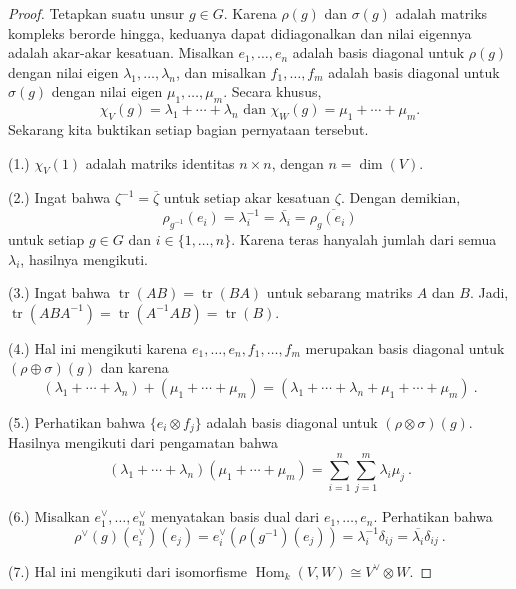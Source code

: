 \documentclass[12pt]{article}
\theoremstyle{plain}
\theoremstyle{definition}
\theoremstyle{remark}
\numberwithin{equation}{section}
\begin{document}
\begin{proof}
Tetapkan suatu unsur $g \in G$.
Karena $\rho(g)$ dan $\sigma(g)$ adalah matriks kompleks berorde hingga,
keduanya dapat didiagonalkan dan nilai eigennya adalah akar-akar kesatuan.
Misalkan $e_1,\ldots,e_n$ adalah basis diagonal untuk $\rho(g)$
dengan nilai eigen $\lambda_1, \ldots, \lambda_n$, dan
misalkan $f_1, \ldots, f_m$ adalah basis diagonal untuk $\sigma(g)$
dengan nilai eigen $\mu_1, \ldots, \mu_m$.
Secara khusus,
\[
\chi_V(g) = \lambda_1 + \cdots + \lambda_n \textrm{ dan }
\chi_W(g) = \mu_1 + \cdots + \mu_m.
\]
Sekarang kita buktikan setiap bagian pernyataan tersebut.

(1.)
$\chi_V(1)$ adalah matriks identitas $n \times n$, dengan $n=\dim(V)$.


(2.)
Ingat bahwa $\zeta^{-1}=\overline{\zeta}$ untuk setiap akar kesatuan
$\zeta$.
Dengan demikian,
\[
\rho_{g^{-1}}(e_i)=\lambda_i^{-1}=\overline{\lambda_i}=\overline{\rho_g(e_i)}
\]
untuk setiap $g \in G$ dan $i \in \{1,\ldots,n\}$.
Karena teras hanyalah jumlah dari semua $\lambda_i$, hasilnya
mengikuti.

(3.) Ingat bahwa $\operatorname{tr}(AB)=\operatorname{tr}(BA)$ untuk sebarang
matriks $A$ dan $B$. Jadi,
$\operatorname{tr}(ABA^{-1})=\operatorname{tr}(A^{-1}AB)=\operatorname{tr}(B)$.



(4.) Hal ini mengikuti karena $e_1, \ldots, e_n, f_1, \ldots, f_m$ merupakan
basis diagonal untuk $(\rho \oplus \sigma)(g)$ dan karena
\[
(\lambda_1 + \cdots + \lambda_n) + (\mu_1 + \cdots + \mu_m) = 
(\lambda_1 + \cdots + \lambda_n + \mu_1 + \cdots + \mu_m) \ .
\]



(5.) Perhatikan bahwa $\{ e_i \otimes f_j \}$ adalah basis diagonal untuk
$(\rho \otimes \sigma)(g)$. Hasilnya mengikuti dari pengamatan
bahwa
\[
(\lambda_1 + \cdots + \lambda_n) (\mu_1 + \cdots + \mu_m)
= \sum_{i=1}^n \sum_{j=1}^m \lambda_i \mu_j \ .
\]



(6.) Misalkan $e_1^\vee, \ldots, e_n^\vee$ menyatakan basis dual dari $e_1,
\ldots, e_n$.
Perhatikan bahwa
\[
\rho^\vee(g)(e_i^\vee)(e_j)=e_i^\vee(\rho(g^{-1})(e_j))
= \lambda_i^{-1}\delta_{ij}=\overline{\lambda_i}\delta_{ij} \ .
\]



(7.) Hal ini mengikuti dari isomorfisme
$\operatorname{Hom}_k(V,W) \cong V^\vee \otimes W$.
\end{proof}
\end{document}
